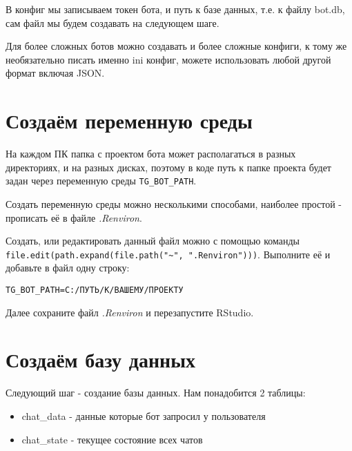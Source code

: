 \documentclass[
]{book}
\providecommand{\tightlist}{%
  \setlength{\itemsep}{0pt}\setlength{\parskip}{0pt}}
\begin{document}
В конфиг мы записываем токен бота, и путь к базе данных, т.е. к файлу bot.db, сам файл мы будем создавать на следующем шаге.

Для более сложных ботов можно создавать и более сложные конфиги, к тому же необязательно писать именно ini конфиг, можете использовать любой другой формат включая JSON.

\hypertarget{ux441ux43eux437ux434ux430ux451ux43c-ux43fux435ux440ux435ux43cux435ux43dux43dux443ux44e-ux441ux440ux435ux434ux44b}{%
\section{Создаём переменную среды}\label{ux441ux43eux437ux434ux430ux451ux43c-ux43fux435ux440ux435ux43cux435ux43dux43dux443ux44e-ux441ux440ux435ux434ux44b}}

На каждом ПК папка с проектом бота может располагаться в разных директориях, и на разных дисках, поэтому в коде путь к папке проекта будет задан через переменную среды \texttt{TG\_BOT\_PATH}.

Создать переменную среды можно несколькими способами, наиболее простой - прописать её в файле \emph{.Renviron}.

Создать, или редактировать данный файл можно с помощью команды \texttt{file.edit(path.expand(file.path("\textasciitilde{}",\ ".Renviron")))}. Выполните её и добавьте в файл одну строку:

\begin{verbatim}
TG_BOT_PATH=C:/ПУТЬ/К/ВАШЕМУ/ПРОЕКТУ
\end{verbatim}

Далее сохраните файл \emph{.Renviron} и перезапустите RStudio.

\hypertarget{ux441ux43eux437ux434ux430ux451ux43c-ux431ux430ux437ux443-ux434ux430ux43dux43dux44bux445}{%
\section{Создаём базу данных}\label{ux441ux43eux437ux434ux430ux451ux43c-ux431ux430ux437ux443-ux434ux430ux43dux43dux44bux445}}

Следующий шаг - создание базы данных. Нам понадобится 2 таблицы:

\begin{itemize}
\tightlist
\item
  chat\_data - данные которые бот запросил у пользователя
\item
  chat\_state - текущее состояние всех чатов
\end{itemize}
\end{document}
